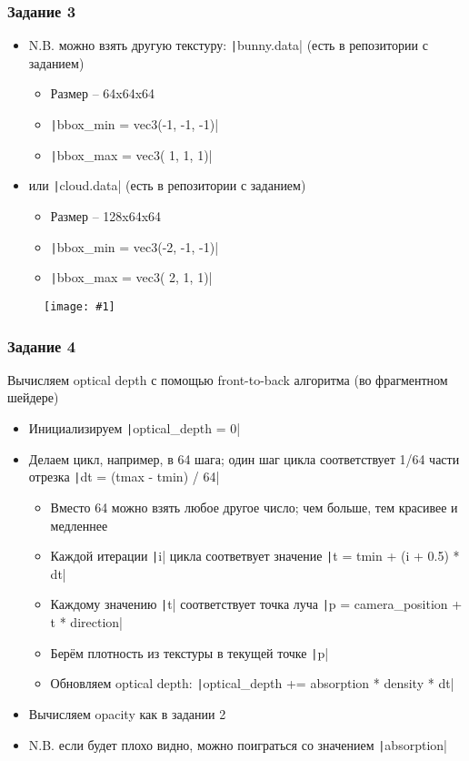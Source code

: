 \documentclass[10pt]{beamer}
\newcommand{\slideimage}[1]{
  \begin{figure}
    \begin{adjustbox}{width=\textwidth, totalheight=\textheight-2\baselineskip-2\baselineskip,keepaspectratio}
      \texttt{[image: \#1]}
    \end{adjustbox}
  \end{figure}
}
\begin{document}
\begin{frame}[fragile]
\frametitle{Задание 3}
\begin{itemize}
\item N.B. можно взять другую текстуру: \texttt|bunny.data| (есть в репозитории с заданием)
\begin{itemize}
\item Размер -- 64x64x64
\item \texttt|bbox_min = vec3(-1, -1, -1)|
\item \texttt|bbox_max = vec3( 1,  1,  1)|
\end{itemize}
\item или \texttt|cloud.data| (есть в репозитории с заданием)
\begin{itemize}
\item Размер -- 128x64x64
\item \texttt|bbox_min = vec3(-2, -1, -1)|
\item \texttt|bbox_max = vec3( 2,  1,  1)|
\end{itemize}
\end{itemize}
\end{frame}

\begin{frame}[fragile]
\slideimage{3.png}
\end{frame}

\begin{frame}[fragile]
\frametitle{Задание 4}
Вычисляем optical depth с помощью front-to-back алгоритма (во фрагментном шейдере)
\begin{itemize}
\item Инициализируем \texttt|optical_depth = 0|
\item Делаем цикл, например, в 64 шага; один шаг цикла соответствует 1/64 части отрезка \texttt|dt = (tmax - tmin) / 64|
\begin{itemize}
\item Вместо 64 можно взять любое другое число; чем больше, тем красивее и медленнее
\item Каждой итерации \texttt|i| цикла соответвует значение \texttt|t = tmin + (i + 0.5) * dt|
\item Каждому значению \texttt|t| соответствует точка луча \texttt|p = camera_position + t * direction|
\item Берём плотность из текстуры в текущей точке \texttt|p|
\item Обновляем optical depth: \texttt|optical_depth += absorption * density * dt|
\end{itemize}
\item Вычисляем opacity как в задании 2
\item N.B. если будет плохо видно, можно поиграться со значением \texttt|absorption|
\end{itemize}
\end{frame}
\end{document}
